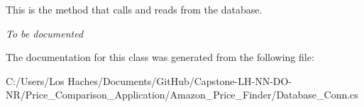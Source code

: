 This is the method that calls and reads from the database. 

{\itshape To be documented} 

The documentation for this class was generated from the following file\-:\begin{DoxyCompactItemize}
\item 
C\-:/\-Users/\-Los Haches/\-Documents/\-Git\-Hub/\-Capstone-\/\-L\-H-\/\-N\-N-\/\-D\-O-\/\-N\-R/\-Price\-\_\-\-Comparison\-\_\-\-Application/\-Amazon\-\_\-\-Price\-\_\-\-Finder/Database\-\_\-\-Conn.\-cs\end{DoxyCompactItemize}

